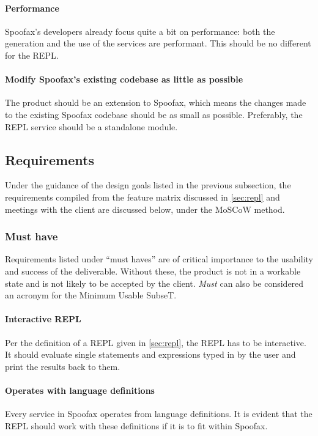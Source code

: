 \paragraph{Performance} Spoofax's developers already focus quite a bit on
performance: both the generation and the use of the services are performant.
This should be no different for the REPL.

\paragraph{Modify Spoofax's existing codebase as little as possible} The product
should be an extension to Spoofax, which means the changes made to the existing
Spoofax codebase should be as small as possible. Preferably, the REPL service
should be a standalone module.

\subsection{Requirements}
\label{ssec:requirements}

Under the guidance of the design goals listed in the previous subsection, the
requirements compiled from the feature matrix discussed in \cref{sec:repl} and
meetings with the client are discussed below, under the MoSCoW method.

\subsubsection{Must have}

Requirements listed under ``must haves'' are of critical importance to the
usability and success of the deliverable. Without these, the product is not in a
workable state and is not likely to be accepted by the client. \emph{Must} can
also be considered an acronym for the Minimum Usable SubseT.

\paragraph{Interactive REPL} Per the definition of a REPL given in
\cref{sec:repl}, the REPL has to be interactive. It should evaluate single
statements and expressions typed in by the user and print the results back to
them.

\paragraph{Operates with language definitions} Every service in Spoofax operates
from language definitions. It is evident that the REPL should work with these
definitions if it is to fit within Spoofax.

